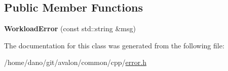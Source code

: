 \subsection*{Public Member Functions}
\begin{DoxyCompactItemize}
\item 
\mbox{\label{classtcf_1_1error_1_1WorkloadError_a71386c42a3e327f6ad2c626d2ab83d1e}} 
{\bfseries Workload\+Error} (const std\+::string \&msg)
\end{DoxyCompactItemize}


The documentation for this class was generated from the following file\+:\begin{DoxyCompactItemize}
\item 
/home/dano/git/avalon/common/cpp/\hyperlink{error_8h}{error.\+h}\end{DoxyCompactItemize}
